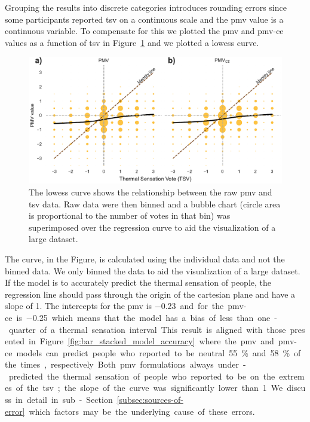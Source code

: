 Grouping the results into discrete categories introduces rounding errors since some participants reported \ac{tsv} on a continuous scale and the \ac{pmv} value is a continuous variable.
To compensate for this we plotted the \ac{pmv} and \ac{pmv-ce} values as a function of \ac{tsv} in Figure~\ref{fig:bubble_models_vs_tsv} and we plotted a \ac{lowess} curve.
\begin{figure}[htb!]
    \centering
    \includegraphics[width=\textwidth]{figures/bubble_models_vs_tsv}
    \caption{The \ac{lowess} curve shows the relationship between the raw \ac{pmv} and \ac{tsv} data.
    Raw data were then binned and a bubble chart (circle area is proportional to the number of votes in that bin) was superimposed over the regression curve to aid the visualization of a large dataset.}
    \label{fig:bubble_models_vs_tsv}
\end{figure}
The curve, in the Figure, is calculated using the individual data and not the binned data.
We only binned the data to aid the visualization of a large dataset.
If the model is to accurately predict the thermal sensation of people, the regression line should pass through the origin of the cartesian plane and have a slope of 1.
The intercepts for the \ac{pmv} is \qty{-0.23} and for the \ac{pmv-ce} is \qty{-0.25} which means that the model has a bias of less than one-quarter of a thermal sensation interval.
This result is aligned with those presented in Figure~\ref{fig:bar_stacked_model_accuracy} where the \ac{pmv} and \ac{pmv-ce} models can predict people who reported to be neutral \qty{55}{\percent} and \qty{58}{\percent} of the times, respectively.
Both \ac{pmv} formulations always under-predicted the thermal sensation of people who reported to be on the extremes of the \ac{tsv};
the slope of the curve was significantly lower than 1.
We discuss in detail in sub-Section~\ref{subsec:sources-of-error} which factors may be the underlying cause of these errors.

